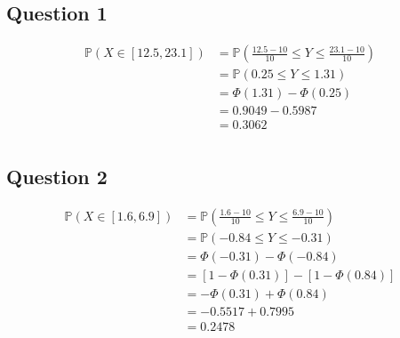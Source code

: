 \documentclass{article}
\renewcommand{\P}{\mathbb{P}}
\begin{document}
\subsection{Question 1}
\begin{align*}
    \P(X \in [12.5, 23.1])
     & =
    \P(\frac{12.5 - 10}{10} \leq Y \leq \frac{23.1 - 10}{10}) \\
     & =
    \P(0.25 \leq Y \leq 1.31)                                 \\
     & =
    \Phi(1.31) - \Phi(0.25)                                   \\
     & =
    0.9049 - 0.5987                                           \\
     & =
    0.3062                                                    \\
\end{align*}

\subsection{Question 2}
\begin{align*}
    \P(X \in [1.6, 6.9])
     & =
    \P(\frac{1.6 - 10}{10} \leq Y \leq \frac{6.9 - 10}{10})       \\
     & =
    \P(-0.84 \leq Y \leq -0.31)                                   \\
     & =
    \Phi(-0.31) - \Phi(-0.84)                                     \\
     & =
    \left[ 1 - \Phi(0.31) \right] - \left[ 1 - \Phi(0.84) \right] \\
     & =
    - \Phi(0.31) + \Phi(0.84)                                     \\
     & =
    - 0.5517 + 0.7995                                             \\
     & =
    0.2478                                                        \\
\end{align*}
\end{document}
